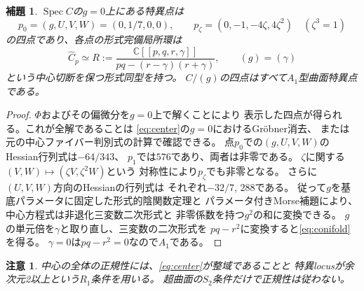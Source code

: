 \documentclass[11pt,a4paper]{ltjsarticle}
\newtheorem{lemma}[theorem]{補題}
\newtheorem{remark}[theorem]{注意}
\newcommand{\CC}{\mathbb C}
\newcommand{\Spec}{\operatorname{Spec}}
\begin{document}
\begin{lemma}\label{lem:four}
$\Spec C$の$g=0$上にある特異点は
\[
 p_0=(g,U,V,W)=(0,1/7,0,0),\qquad
 p_\zeta=(0,-1,-4\zeta,4\zeta^2)\quad(\zeta^3=1)
\]
の四点であり、各点の形式完備局所環は
\begin{equation}\label{eq:conifold}
 \widehat C_{p}\simeq
 R:=\frac{\CC[[p,q,r,\gamma]]}
 {pq-(r-\gamma)(r+\gamma)},\qquad (g)=(\gamma)
\end{equation}
という中心切断を保つ形式同型を持つ。
$C/(g)$の四点はすべて$A_1$型曲面特異点である。
\end{lemma}
\begin{proof}
$\Phi$およびその偏微分を$g=0$上で解くことにより
表示した四点が得られる。これが全解であることは
\eqref{eq:center}の$g=0$におけるGr\"obner消去、
または元の中心ファイバー判別式の計算で確認できる。
点$p_0$での$(g,U,V,W)$のHessian行列式は$-64/343$、
$p_1$では$576$であり、両者は非零である。
$\zeta$に関する$(V,W)\mapsto(\zeta V,\zeta^2W)$という
対称性により$p_\zeta$でも非零となる。
さらに$(U,V,W)$方向のHessianの行列式は
それぞれ$-32/7$, $288$である。
従って$g$を基底パラメータに固定した形式的陰関数定理と
パラメータ付きMorse補題により、
中心方程式は非退化三変数二次形式と
非零係数を持つ$g^2$の和に変換できる。
$g$の単元倍を$\gamma$と取り直し、三変数の二次形式を
$pq-r^2$に変換すると\eqref{eq:conifold}を得る。
$\gamma=0$は$pq-r^2=0$なので$A_1$である。
\end{proof}
\begin{remark}
中心の全体の正規性には、\eqref{eq:center}が整域であることと
特異locusが余次元2以上という$R_1$条件を用いる。
超曲面の$S_2$条件だけで正規性は従わない。
\end{remark}


\end{document}
